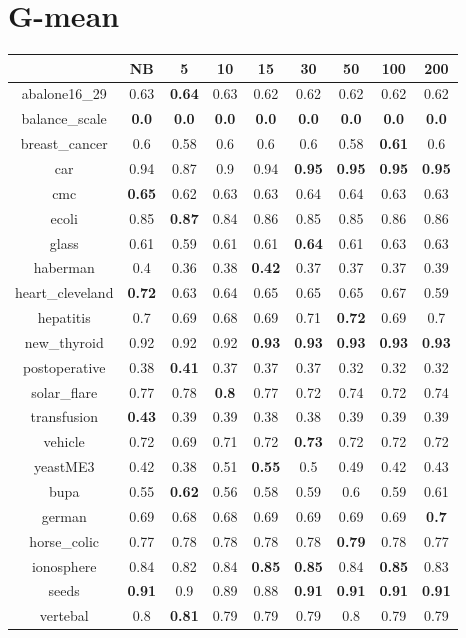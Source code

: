 \documentclass{article}%
\begin{document}
%
\section*{G{-}mean}%
\begin{tabular}{c|cccccccc}%
\hline%
&NB&5&10&15&30&50&100&200\\%
\hline%
abalone16\_29&0.63&\textbf{0.64}&0.63&0.62&0.62&0.62&0.62&0.62\\%
\hline%
balance\_scale&\textbf{0.0}&\textbf{0.0}&\textbf{0.0}&\textbf{0.0}&\textbf{0.0}&\textbf{0.0}&\textbf{0.0}&\textbf{0.0}\\%
\hline%
breast\_cancer&0.6&0.58&0.6&0.6&0.6&0.58&\textbf{0.61}&0.6\\%
\hline%
car&0.94&0.87&0.9&0.94&\textbf{0.95}&\textbf{0.95}&\textbf{0.95}&\textbf{0.95}\\%
\hline%
cmc&\textbf{0.65}&0.62&0.63&0.63&0.64&0.64&0.63&0.63\\%
\hline%
ecoli&0.85&\textbf{0.87}&0.84&0.86&0.85&0.85&0.86&0.86\\%
\hline%
glass&0.61&0.59&0.61&0.61&\textbf{0.64}&0.61&0.63&0.63\\%
\hline%
haberman&0.4&0.36&0.38&\textbf{0.42}&0.37&0.37&0.37&0.39\\%
\hline%
heart\_cleveland&\textbf{0.72}&0.63&0.64&0.65&0.65&0.65&0.67&0.59\\%
\hline%
hepatitis&0.7&0.69&0.68&0.69&0.71&\textbf{0.72}&0.69&0.7\\%
\hline%
new\_thyroid&0.92&0.92&0.92&\textbf{0.93}&\textbf{0.93}&\textbf{0.93}&\textbf{0.93}&\textbf{0.93}\\%
\hline%
postoperative&0.38&\textbf{0.41}&0.37&0.37&0.37&0.32&0.32&0.32\\%
\hline%
solar\_flare&0.77&0.78&\textbf{0.8}&0.77&0.72&0.74&0.72&0.74\\%
\hline%
transfusion&\textbf{0.43}&0.39&0.39&0.38&0.38&0.39&0.39&0.39\\%
\hline%
vehicle&0.72&0.69&0.71&0.72&\textbf{0.73}&0.72&0.72&0.72\\%
\hline%
yeastME3&0.42&0.38&0.51&\textbf{0.55}&0.5&0.49&0.42&0.43\\%
\hline%
bupa&0.55&\textbf{0.62}&0.56&0.58&0.59&0.6&0.59&0.61\\%
\hline%
german&0.69&0.68&0.68&0.69&0.69&0.69&0.69&\textbf{0.7}\\%
\hline%
horse\_colic&0.77&0.78&0.78&0.78&0.78&\textbf{0.79}&0.78&0.77\\%
\hline%
ionosphere&0.84&0.82&0.84&\textbf{0.85}&\textbf{0.85}&0.84&\textbf{0.85}&0.83\\%
\hline%
seeds&\textbf{0.91}&0.9&0.89&0.88&\textbf{0.91}&\textbf{0.91}&\textbf{0.91}&\textbf{0.91}\\%
\hline%
vertebal&0.8&\textbf{0.81}&0.79&0.79&0.79&0.8&0.79&0.79\\%
\hline%
\end{tabular}

%
\end{document}
